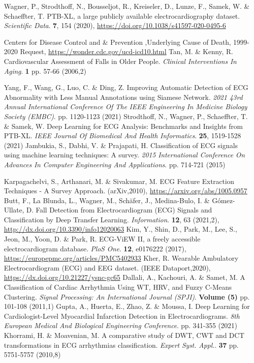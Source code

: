 \documentclass{ieeeaccess}
\begin{document}
\begin{thebibliography}{1}
Wagner, P., Strodthoff, N., Bousseljot, R., Kreiseler, D., Lunze, F., Samek, W. \& Schaeffter, T. PTB-XL, a large publicly available electrocardiography dataset. {\em Scientific Data}. \textbf{7}, 154 (2020), \url{https://doi.org/10.1038/s41597-020-0495-6}


Centers for Disease Control and \& Prevention ,Underlying Cause of Death, 1999-2020 Request,  \url{https://wonder.cdc.gov/ucd-icd10.html}
Tan, M. \& Kenny, R. Cardiovascular Assessment of Falls in Older People. {\em Clinical Interventions In Aging}. \textbf{1} pp. 57-66 (2006,2)

Yang, F., Wang, G., Luo, C. \& Ding, Z. Improving Automatic Detection of ECG Abnormality with Less Manual Annotations using Siamese Network. {\em 2021 43rd Annual International Conference Of The IEEE Engineering In Medicine Biology Society (EMBC)}. pp. 1120-1123 (2021)
Strodthoff, N., Wagner, P., Schaeffter, T. \& Samek, W. Deep Learning for ECG Analysis: Benchmarks and Insights from PTB-XL. {\em IEEE Journal Of Biomedical And Health Informatics}. \textbf{25}, 1519-1528 (2021)
 Jambukia, S., Dabhi, V. \& Prajapati, H. Classification of ECG signals using machine learning techniques: A survey. {\em 2015 International Conference On Advances In Computer Engineering And Applications}. pp. 714-721 (2015)

Karpagachelvi, S., Arthanari, M. \& Sivakumar, M. ECG Feature Extraction Techniques - A Survey Approach. (arXiv,2010), \url{https://arxiv.org/abs/1005.0957}
Butt, F., La Blunda, L., Wagner, M., Schäfer, J., Medina-Bulo, I. \& Gómez-Ullate, D. Fall Detection from Electrocardiogram (ECG) Signals and Classification by Deep Transfer Learning. {\em Information}. \textbf{12}, 63 (2021,2), \url{http://dx.doi.org/10.3390/info12020063}
Kim, Y., Shin, D., Park, M., Lee, S., Jeon, M., Yoon, D. \& Park, R. ECG-ViEW II, a freely accessible electrocardiogram database. {\em PloS One}. \textbf{12}, e0176222 (2017), \url{https://europepmc.org/articles/PMC5402933}
Kher, R. Wearable Ambulatory Electrocardiogram (ECG) and EEG dataset. (IEEE Dataport,2020), \url{https://dx.doi.org/10.21227/ysnc-gc65}
Dallali, A., Kachouri, A. \& Samet, M. A Classification of Cardiac Arrhythmia Using WT, HRV, and Fuzzy C-Means Clustering. {\em Signal Processing: An International Journal (SPJI)}. \textbf{Volume (5)} pp. 101-108 (2011,1)
Gupta, A., Huerta, E., Zhao, Z. \& Moussa, I. Deep Learning for Cardiologist-Level Myocardial Infarction Detection in Electrocardiograms. {\em 8th European Medical And Biological Engineering Conference}. pp. 341-355 (2021)
Khorrami, H. \& Moavenian, M. A comparative study of DWT, CWT and DCT transformations in ECG arrhythmias classification. {\em Expert Syst. Appl.}. \textbf{37} pp. 5751-5757 (2010,8)


\end{thebibliography}
\end{document}

